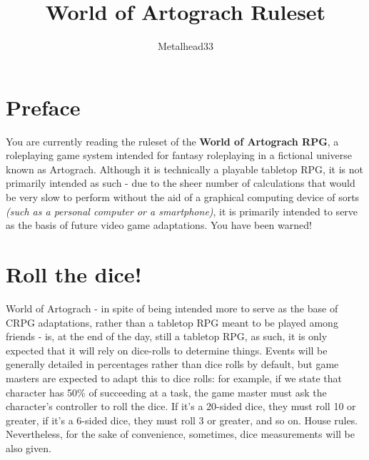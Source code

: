 \documentclass[openany,11pt,a4paper]{book}
\author{Metalhead33}
\title{World of Artograch Ruleset}
\begin{document}
\maketitle
\tableofcontents
\chapter*{Preface}
You are currently reading the ruleset of the \textbf{World of Artograch RPG}, a roleplaying game system intended for fantasy roleplaying in a fictional universe known as Artograch. Although it is technically a playable tabletop RPG, it is not primarily intended as such - due to the sheer number of calculations that would be very slow to perform without the aid of a graphical computing device of sorts \textit{(such as a personal computer or a smartphone)}, it is primarily intended to serve as the basis of future video game adaptations. You have been warned!\newline
\chapter{Roll the dice!}
World of Artograch - in spite of being intended more to serve as the base of CRPG adaptations, rather than a tabletop RPG meant to be played among friends - is, at the end of the day, still a tabletop RPG, as such, it is only expected that it will rely on dice-rolls to determine things. Events will be generally detailed in percentages rather than dice rolls by default, but game masters are expected to adapt this to dice rolls: for example, if we state that character has 50\% of succeeding at a task, the game master must ask the character's controller to roll the dice. If it's a 20-sided dice, they must roll 10 or greater, if it's a 6-sided dice, they must roll 3 or greater, and so on. House rules. Nevertheless, for the sake of convenience, sometimes, dice measurements will be also given.
\end{document}
